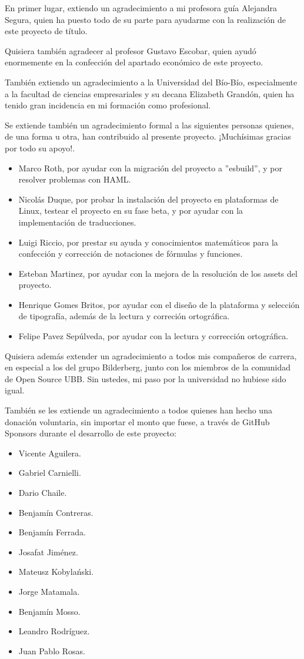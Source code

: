 En primer lugar, extiendo un agradecimiento a mi profesora guía Alejandra Segura, quien ha puesto todo de su parte para ayudarme con la realización de este proyecto de título.

Quisiera también agradecer al profesor Gustavo Escobar, quien ayudó enormemente en la confección del apartado económico de este proyecto.

También extiendo un agradecimiento a la Universidad del Bío-Bío, especialmente a la facultad de ciencias empresariales y su decana Elizabeth Grandón, quien ha tenido gran incidencia en mi formación como profesional.

Se extiende también un agradecimiento formal a las siguientes personas quienes, de una forma u otra, han contribuido al presente proyecto. ¡Muchísimas gracias por todo su apoyo!.

\begin{itemize}
	\item Marco Roth, por ayudar con la migración del proyecto a ''esbuild'', y por resolver problemas con HAML.
	\item Nicolás Duque, por probar la instalación del proyecto en plataformas de Linux, testear el proyecto en su fase beta, y por ayudar con la implementación de traducciones.
	\item Luigi Riccio, por prestar su ayuda y conocimientos matemáticos para la confección y corrección de notaciones de fórmulas y funciones. 
	\item Esteban Martinez, por ayudar con la mejora de la resolución de los assets del proyecto.
	\item Henrique Gomes Britos, por ayudar con el diseño de la plataforma y selección de tipografía, además de la lectura y correción ortográfica.
  \item Felipe Pavez Sepúlveda, por ayudar con la lectura y corrección ortográfica.
\end{itemize}

\pagebreak

Quisiera además extender un agradecimiento a todos mis compañeros de carrera, en especial a los del grupo Bilderberg, junto con los miembros de la comunidad de Open Source UBB. Sin ustedes, mi paso por la universidad no hubiese sido igual.

También se les extiende un agradecimiento a todos quienes han hecho una donación voluntaria, sin importar el monto que fuese, a través de GitHub Sponsors durante el desarrollo de este proyecto:
\begin{itemize}
  \item Vicente Aguilera.
  \item Gabriel Carnielli.
  \item Dario Chaile.
  \item Benjamín Contreras.
  \item Benjamín Ferrada.
  \item Josafat Jiménez.
  \item  Mateusz Kobylański.
  \item Jorge Matamala.
  \item Benjamín Mosso.
  \item Leandro Rodríguez.
  \item Juan Pablo Rosas.
\end{itemize}
